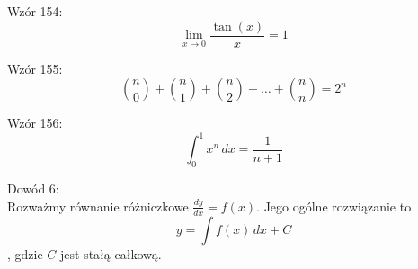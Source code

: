 \documentclass{article}
\begin{document}
Wzór 154:
\[ \lim_{{x \to 0}} \frac{\tan(x)}{x} = 1 \]

Wzór 155:
\[ \binom{n}{0} + \binom{n}{1} + \binom{n}{2} + \ldots + \binom{n}{n} = 2^n \]

Wzór 156:
\[ \int_{0}^{1} x^n \,dx = \frac{1}{n+1} \]

Dowód 6: \\
Rozważmy równanie różniczkowe \( \frac{dy}{dx} = f(x) \). Jego ogólne rozwiązanie to
\[ y = \int f(x) \,dx + C \],
gdzie \( C \) jest stałą całkową.
\end{document}

